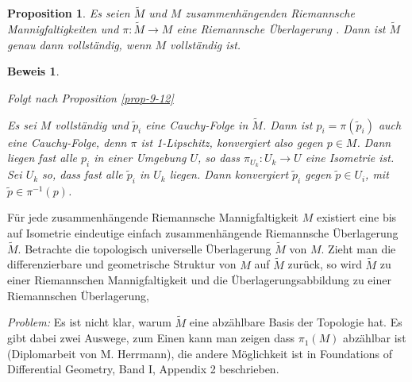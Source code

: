 \documentclass[paper=A4, twoside, chapterprefix=true, bibliography=totoc, headsepline]{scrbook}
\theoremstyle{plain}
\newtheorem{Prop}[Dfn]{Proposition}
\theoremstyle{nonumberplain}
\newtheorem{bew}{Beweis}
\theoremstyle{empty}
\theoremstyle{break}
\newcommand{\quot}[1]{\textrm{\glqq}{#1}\textrm{\grqq}}
\begin{document}
\begin{Prop}
  Es seien $\tilde M$ und $M$ zusammenh\"angenden Riemannsche Mannigfaltigkeiten und $\pi: \tilde M \to M$ eine Riemannsche \"Uberlagerung . Dann ist $\tilde M$ genau dann vollst\"andig, wenn $M$ vollst\"andig ist.
\end{Prop}

\begin{bew}\begin{description}[font=\normalfont]
  \item[\quot{$\Rightarrow$}:]
    Folgt nach Proposition \ref{prop-9-12}
  \item[\quot{$\Leftarrow$}:]
    Es sei $M$ vollst\"andig und $\tilde p_i$ eine Cauchy-Folge in $\tilde M$.
    Dann ist $p_i = \pi(\tilde p_i)$ auch eine Cauchy-Folge, denn $\pi$ ist 1-Lipschitz, konvergiert also gegen $p \in M$.
    Dann liegen fast alle $p_i$ in einer Umgebung $U$, so dass $\pi_{U_k}: U_k \to U$ eine Isometrie ist.
    Sei $U_k$ so, dass fast alle $\tilde p_i$ in $U_k$ liegen.
    Dann konvergiert $\tilde p_i$ gegen $\tilde p \in U_i$, mit $\tilde p \in \pi^{-1}(p)$.
  \end{description}\end{bew}

F\"ur jede zusammenh\"angende Riemannsche Mannigfaltigkeit $M$ existiert eine bis auf Isometrie eindeutige einfach zusammenh\"angende Riemannsche \"Uberlagerung $\tilde M$.
Betrachte die topologisch universelle \"Uberlagerung $\tilde M$ von $M$.
Zieht man die differenzierbare und geometrische Struktur von $M$ auf $\tilde M$ zur\"uck, so wird $\tilde M$ zu einer Riemannschen Mannigfaltigkeit und die \"Uberlagerungsabbildung zu einer Riemannschen \"Uberlagerung,

\emph{Problem:} Es ist nicht klar, warum $\tilde M$ eine abz\"ahlbare Basis der Topologie hat.
Es gibt dabei zwei Auswege, zum Einen kann man zeigen dass $\pi_1(M)$ abz\"ahlbar ist (Diplomarbeit von M. Herrmann), die andere M\"oglichkeit ist in \quot{Foundations of Differential Geometry}, Band I, Appendix 2 \cite{kobayashi-nomizu1963foundations-diffgeo} beschrieben.
\end{document}
